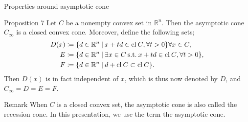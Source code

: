 \documentclass[aspectratio=169, dvipdfmx, 11pt]{beamer}
\newcommand{\NDemenstionalRealEuclideanSpace}{\mathbb{R}^n}
\newcommand{\Closure}[1]{\text{\rm cl\:${#1}$}} %
\newcommand{\SuchThat}{\:\text{s.t.}\:}
\newcommand{\SetForm}[2]{
  \{{#1}\:|\:{#2}\}
}
\begin{document}
\begin{frame}{Properties around asymptotic cone}
  \begin{block}{Proposition 7}
    Let $C$ be a nonempty convex set in $\NDemenstionalRealEuclideanSpace$. Then the asymptotic cone $C_{\infty}$ is a closed convex cone. Moreover, define the following sets;
    \begin{align}
      D(x) &\coloneqq \SetForm{d \in \NDemenstionalRealEuclideanSpace}{x+td \in \Closure{C}, \forall t > 0} \forall x \in C, \notag \\
      E &\coloneqq \SetForm{d \in \NDemenstionalRealEuclideanSpace}{\exists x \in C \SuchThat x+td \in \Closure{C}, \forall t > 0}, \notag \\
      F &\coloneqq \SetForm{d \in \NDemenstionalRealEuclideanSpace}{d + \Closure{C} \subset \Closure{C}}. \notag
    \end{align}
    Then $D(x)$ is in fact independent of $x$, which is thus now denoted by $D$, and $C_{\infty} = D = E = F$.
  \end{block}

  \begin{alertblock}{Remark}
    When $C$ is a closed convex set, the asymptotic cone is also called the recession cone. In this presentation, we use the term the asymptotic cone.
  \end{alertblock}
\end{frame}
\end{document}
